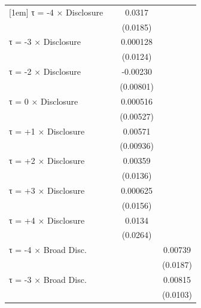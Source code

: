 \begin{table}[htbp]
\begin{tabular}{l*{3}{c}}
[1em]
τ = -4 × Disclosure &                     &      0.0317\sym{*}  &                     \\
                    &                     &    (0.0185)         &                     \\
[1em]
τ = -3 × Disclosure &                     &    0.000128         &                     \\
                    &                     &    (0.0124)         &                     \\
[1em]
τ = -2 × Disclosure &                     &    -0.00230         &                     \\
                    &                     &   (0.00801)         &                     \\
[1em]
τ = 0 × Disclosure  &                     &    0.000516         &                     \\
                    &                     &   (0.00527)         &                     \\
[1em]
τ = +1 × Disclosure &                     &     0.00571         &                     \\
                    &                     &   (0.00936)         &                     \\
[1em]
τ = +2 × Disclosure &                     &     0.00359         &                     \\
                    &                     &    (0.0136)         &                     \\
[1em]
τ = +3 × Disclosure &                     &    0.000625         &                     \\
                    &                     &    (0.0156)         &                     \\
[1em]
τ = +4 × Disclosure &                     &      0.0134         &                     \\
                    &                     &    (0.0264)         &                     \\
[1em]
τ = -4 × Broad Disc.&                     &                     &     0.00739         \\
                    &                     &                     &    (0.0187)         \\
[1em]
τ = -3 × Broad Disc.&                     &                     &     0.00815         \\
                    &                     &                     &    (0.0103)         \\

\end{tabular}
\end{table}
